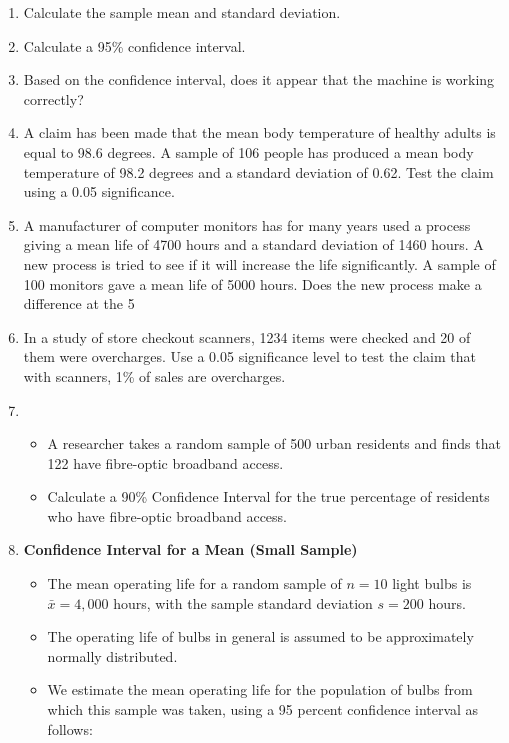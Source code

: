 \documentclass[]{report}
\begin{document}
\begin{enumerate}
\item Calculate the sample mean and standard deviation. 
 \item Calculate a 95\% confidence interval.  
 \item Based on the confidence interval, does it appear that the machine is working correctly?


\item A claim has been made that the mean body temperature of healthy adults is equal to 98.6 degrees. 
A sample of 106 people has produced a mean body temperature of 98.2 degrees and a standard deviation of 0.62. Test the claim using a 0.05 significance.

\item A manufacturer of computer monitors  has for many years used a process giving a mean life of 4700 hours and a standard deviation of 1460 hours. 
A new process is tried to see if it will increase the life significantly. A sample of 100 monitors gave a mean life of 5000 hours.  
Does the new process make a difference at the 5%

\item In a study of store checkout scanners, 1234 items were checked and 20 of them were overcharges.
Use a 0.05 significance level to test the claim that with scanners, 1\% of sales are overcharges.



\item 


\begin{itemize}
\item A researcher takes a random sample of 500 urban residents and finds that
122 have fibre-optic broadband access. 
\item Calculate a 90\% Confidence Interval for
the true percentage of residents who have fibre-optic broadband access.
\end{itemize}


\item \textbf{Confidence Interval for a Mean (Small Sample)} \\
\begin{itemize}
\item The mean operating life for a random sample of $n = 10$ light bulbs is $\bar{x} = 4,000$ hours, with the sample
standard deviation $s = 200$ hours. 

\item The operating life of bulbs in general is assumed to be approximately normally distributed.
\item We estimate the mean operating life for the population of bulbs from which this sample was taken, using a 95 percent confidence interval as follows:


\end{itemize}
\end{enumerate}
\end{document}
